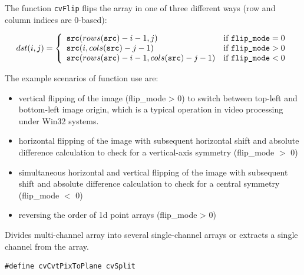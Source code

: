 \begin{description}
\end{description}

The function \texttt{cvFlip} flips the array in one of three different ways (row and column indices are 0-based):

\[
dst(i,j) = \left\{ \begin{array}{l l} \texttt{src}(rows(\texttt{src})-i-1,j) & \mbox{if $\texttt{flip\_mode} = 0$}\\ \texttt{src}(i,cols(\texttt{src})-j-1) & \mbox{if $\texttt{flip\_mode} > 0$}\\ \texttt{src}(rows(\texttt{src})-i-1,cols(\texttt{src})-j-1) & \mbox{if $\texttt{flip\_mode} < 0$}\\ \end{array} \right.
\]

The example scenarios of function use are:
\begin{itemize}
  \item vertical flipping of the image (flip\_mode > 0) to switch between top-left and bottom-left image origin, which is a typical operation in video processing under Win32 systems.
  \item horizontal flipping of the image with subsequent horizontal shift and absolute difference calculation to check for a vertical-axis symmetry (flip\_mode $>$ 0)
  \item simultaneous horizontal and vertical flipping of the image with subsequent shift and absolute difference calculation to check for a central symmetry (flip\_mode $<$ 0)
  \item reversing the order of 1d point arrays (flip\_mode > 0)
\end{itemize}

\label{Split}

Divides multi-channel array into several single-channel arrays or extracts a single channel from the array.


\begin{lstlisting}
#define cvCvtPixToPlane cvSplit
\end{lstlisting}

\begin{description}
\end{description}


